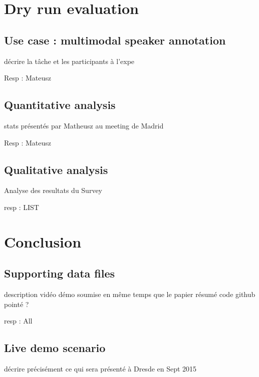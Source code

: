 \documentclass[a4paper]{article}
\begin{document}
  \section{Dry run evaluation}
      \subsection{Use case : multimodal speaker annotation}
     
décrire la tâche et les participants à l'expe

Resp : Mateusz
      
      \subsection{Quantitative analysis}
    
stats présentés par Matheusz au meeting de Madrid

Resp : Mateusz
  
     \subsection{Qualitative analysis}
    
Analyse des resultats du Survey

resp : LIST




  \section{Conclusion}
  
    \subsection{Supporting data files}

description vidéo démo soumise en même temps que le papier
résumé code github pointé ?    

resp : All

    \subsection{Live demo scenario}

décrire précisément ce qui sera présenté à Dresde en Sept 2015

  
  \newpage
  \eightpt
  
  
  
\end{document}
